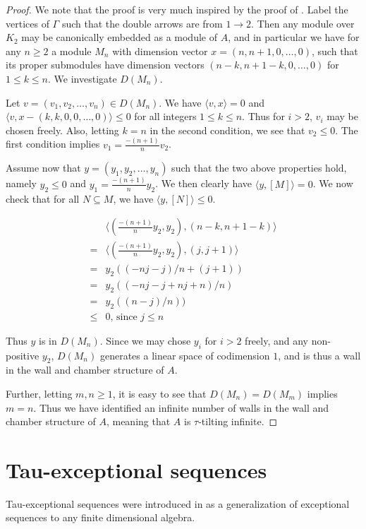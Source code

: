 \documentclass[]{article}
\theoremstyle{definition}
\newcommand{\tu}{\ensuremath{\tau}}
\begin{document}
\begin{proof}
	We note that the proof is very much inspired by the proof of \cite[Theorem 4.14]{Br_stle_2019}. Label the vertices of $\Gamma$ such that the double arrows are from $1 \to 2$. Then any module over $K_2$ may be canonically embedded as a module of $A$, and in particular we have for any $n \geq 2$ a module $M_n$ with dimension vector $x = (n,n+1,0,\dots,0)$, such that its proper submodules have dimension vectors $(n-k,n+1-k,0,\dots,0)$ for $1 \leq k \leq n$. We investigate $D(M_n)$.
	
	Let $v = (v_1,v_2,\dots,v_n) \in D(M_n)$. We have $\langle v,x \rangle = 0$ and $\langle v,x - (k,k,0,0,\dots,0)\rangle \leq 0$ for all integers $1 \leq k \leq n$. Thus for $i > 2$, $v_i$ may be chosen freely. Also, letting $k = n$ in the second condition, we see that $v_2 \leq 0$. The first condition implies $v_1 = \frac{-(n+1)}{n}v_2$.
	
	Assume now that $y = (y_1,y_2,\dots,y_n)$ such that the two above properties hold, namely $y_2 \leq 0$ and $y_1 = \frac{-(n+1)}{n}y_2$. We then clearly have $\langle y,[M]\rangle = 0$. We now check that for all $N \subseteq M$, we have $\langle y,[N]\rangle \leq 0$. 
	
	\begin{align}
	&\langle (\frac{-(n+1)}{n}y_2,y_2), (n-k,n+1-k)\rangle \\
	=&\langle (\frac{-(n+1)}{n}y_2,y_2), (j,j+1)\rangle \\
	=& y_2((-nj-j)/n + (j+1)) \\
	 =& y_2((-nj - j + nj + n)/n) \\
	 =& y_2((n-j)/n)) \\
	 \leq& 0\text{, since } j \leq n
	\end{align}
	
	Thus $y$ is in $D(M_n)$. Since we may chose $y_i$ for $i > 2$ freely, and any non-positive $y_2$, $D(M_n)$ generates a linear space of codimension $1$, and is thus a wall in the wall and chamber structure of $A$.
	
	Further, letting $m,n \geq 1$, it is easy to see that $D(M_n) = D(M_m)$ implies $m = n$. Thus we have identified an infinite number of walls in the wall and chamber structure of $A$, meaning that $A$ is \tu-tilting infinite.
 
\end{proof}



\section{Tau-exceptional sequences}
Tau-exceptional sequences were introduced in \cite{buantau2020} as a generalization of exceptional sequences to any finite dimensional algebra.





\printbibliography
\end{document}
